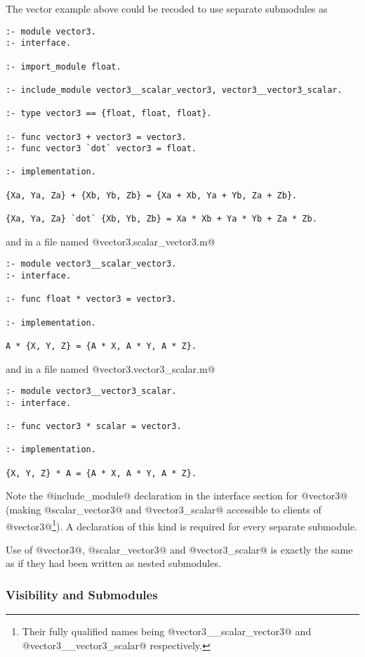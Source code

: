 The vector example above could be recoded to use separate submodules as
\begin{verbatim}
:- module vector3.
:- interface.

:- import_module float.

:- include_module vector3__scalar_vector3, vector3__vector3_scalar.

:- type vector3 == {float, float, float}.

:- func vector3 + vector3 = vector3.
:- func vector3 `dot` vector3 = float.
    
:- implementation.

{Xa, Ya, Za} + {Xb, Yb, Zb} = {Xa + Xb, Ya + Yb, Za + Zb}.

{Xa, Ya, Za} `dot` {Xb, Yb, Zb} = Xa * Xb + Ya * Yb + Za * Zb.
\end{verbatim}
and in a file named @vector3.scalar_vector3.m@
\begin{verbatim}
:- module vector3__scalar_vector3.
:- interface.

:- func float * vector3 = vector3.

:- implementation.

A * {X, Y, Z} = {A * X, A * Y, A * Z}.
\end{verbatim}
and in a file named @vector3.vector3_scalar.m@
\begin{verbatim}
:- module vector3__vector3_scalar.
:- interface.

:- func vector3 * scalar = vector3.

:- implementation.

{X, Y, Z} * A = {A * X, A * Y, A * Z}.
\end{verbatim}
Note the @include_module@ declaration in the interface section for
@vector3@ (making @scalar_vector3@ and @vector3_scalar@ accessible to
clients of @vector3@\footnote{Their fully qualified names being
@vector3\_\_scalar\_vector3@ and @vector3\_\_vector3\_scalar@
respectively.}).  A declaration of this kind is required for every
separate submodule.

Use of @vector3@, @scalar_vector3@ and @vector3_scalar@ is exactly the
same as if they had been written as nested submodules.


\subsubsection{Visibility and Submodules}




